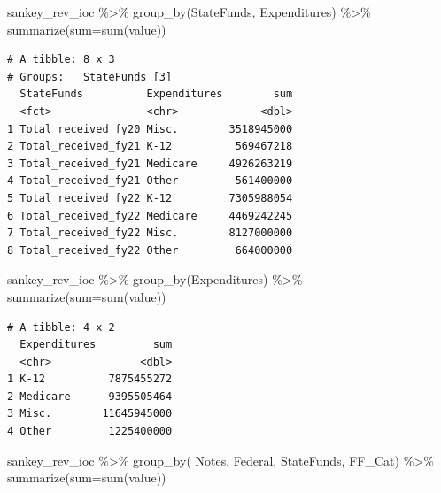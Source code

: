 \documentclass[
  letterpaper,
  DIV=11,
  numbers=noendperiod]{scrreport}
\newenvironment{Shaded}{\begin{snugshade}}{\end{snugshade}}
\newcommand{\AttributeTok}[1]{\textcolor[rgb]{0.40,0.45,0.13}{#1}}
\newcommand{\FunctionTok}[1]{\textcolor[rgb]{0.28,0.35,0.67}{#1}}
\newcommand{\NormalTok}[1]{\textcolor[rgb]{0.00,0.23,0.31}{#1}}
\newcommand{\SpecialCharTok}[1]{\textcolor[rgb]{0.37,0.37,0.37}{#1}}
\begin{document}
\begin{Shaded}
\begin{Highlighting}[]
\NormalTok{sankey\_rev\_ioc }\SpecialCharTok{\%\textgreater{}\%} \FunctionTok{group\_by}\NormalTok{(StateFunds, Expenditures) }\SpecialCharTok{\%\textgreater{}\%} 
  \FunctionTok{summarize}\NormalTok{(}\AttributeTok{sum=}\FunctionTok{sum}\NormalTok{(value))}
\end{Highlighting}
\end{Shaded}

\begin{verbatim}
# A tibble: 8 x 3
# Groups:   StateFunds [3]
  StateFunds          Expenditures        sum
  <fct>               <chr>             <dbl>
1 Total_received_fy20 Misc.        3518945000
2 Total_received_fy21 K-12          569467218
3 Total_received_fy21 Medicare     4926263219
4 Total_received_fy21 Other         561400000
5 Total_received_fy22 K-12         7305988054
6 Total_received_fy22 Medicare     4469242245
7 Total_received_fy22 Misc.        8127000000
8 Total_received_fy22 Other         664000000
\end{verbatim}

\begin{Shaded}
\begin{Highlighting}[]
\NormalTok{sankey\_rev\_ioc }\SpecialCharTok{\%\textgreater{}\%} \FunctionTok{group\_by}\NormalTok{(Expenditures) }\SpecialCharTok{\%\textgreater{}\%} 
  \FunctionTok{summarize}\NormalTok{(}\AttributeTok{sum=}\FunctionTok{sum}\NormalTok{(value))}
\end{Highlighting}
\end{Shaded}

\begin{verbatim}
# A tibble: 4 x 2
  Expenditures         sum
  <chr>              <dbl>
1 K-12          7875455272
2 Medicare      9395505464
3 Misc.        11645945000
4 Other         1225400000
\end{verbatim}

\begin{Shaded}
\begin{Highlighting}[]
\NormalTok{sankey\_rev\_ioc }\SpecialCharTok{\%\textgreater{}\%} \FunctionTok{group\_by}\NormalTok{( Notes, Federal, StateFunds, FF\_Cat) }\SpecialCharTok{\%\textgreater{}\%} 
  \FunctionTok{summarize}\NormalTok{(}\AttributeTok{sum=}\FunctionTok{sum}\NormalTok{(value))}
\end{Highlighting}
\end{Shaded}
\end{document}
